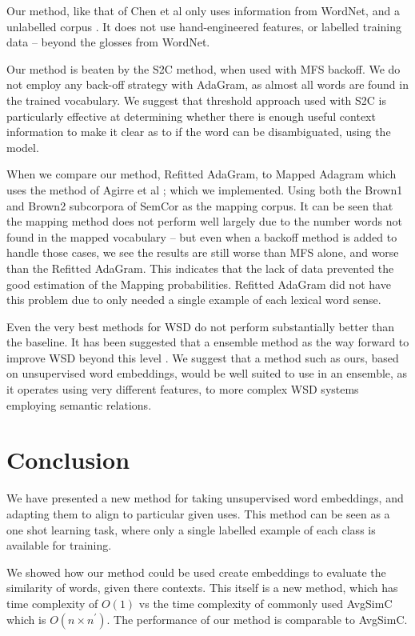 \documentclass{sig-alternate}
\begin{document}
Our method, like that of Chen et al only uses information from WordNet, and a unlabelled corpus \parencite{Chen2014}. It does not use hand-engineered features, or labelled training data -- beyond the glosses from WordNet.

Our method is beaten by the S2C method, when used with MFS backoff.
We do not employ any back-off strategy with AdaGram, as almost all words are found in the trained vocabulary. We suggest that threshold approach used with S2C is particularly effective at determining whether there is enough useful context information to make it clear as to if the word can be disambiguated, using the model.


When we compare our method, Refitted AdaGram, to Mapped Adagram which uses the method of Agirre et al \parencite{agirre2006}; which we implemented. Using both the Brown1 and Brown2 subcorpora of SemCor as the mapping corpus.
It can be seen that the mapping method does not perform well largely due to the number words not found in the mapped vocabulary -- but even when a backoff method is added to handle those cases, we see the results are still worse than MFS alone, and worse than the Refitted AdaGram. This indicates that the lack of data prevented the good estimation of the Mapping probabilities. Refitted AdaGram did not have this problem due to only needed a single example of each lexical word sense.


Even the very best methods for WSD do not perform substantially better than the baseline. It has been suggested that a ensemble method as the way forward to improve WSD beyond this level \cite{saarikoski2006building,saarikoski2006defining}.
We suggest that a method such as ours, based on unsupervised word embeddings, would be well suited to use in an ensemble, as it operates using very different features, to more complex WSD systems employing semantic relations.


\section{Conclusion}\label{conclusion}

We have presented a new method for taking unsupervised word embeddings, and adapting them to align to particular given uses. This method can be seen as a one shot learning task, where only a single labelled example of each class is available for training.


We showed how our method could be used create embeddings to evaluate the similarity of words, given there contexts. This itself is a new method, which has time complexity of $O(1)$ vs the time complexity of commonly used AvgSimC which is $O(n \times n^\prime)$.
The performance of our method is comparable to AvgSimC.
\end{document}

